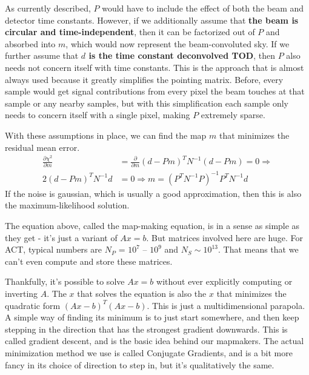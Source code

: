 \documentclass[a4paper, 11pt]{article}
\newcommand{\assume}[1]{{\bf#1}}
\begin{document}
As currently described, $P$ would have to include the effect of both the
beam and detector time constants. However, if we additionally assume that
\assume{the beam is circular and time-independent}, then it can be factorized out
of $P$ and absorbed into $m$, which would now represent the beam-convoluted sky.
If we further assume that \assume{$d$ is the time constant deconvolved TOD}, then $P$ also needs not
concern itself with time constants.
This is the approach that is almost always used because it greatly simplifies
the pointing matrix. Before, every sample would get signal contributions from
every pixel the beam touches at that sample or any nearby samples, but with this
simplification each sample only needs to concern itself with a single pixel,
making $P$ extremely sparse.

With these assumptions in place, we can find the map $m$ that minimizes the
residual mean error.
\begin{align}
	\frac{\partial\chi^2}{\partial m} &= \frac{\partial}{\partial m}(d-Pm)^T N^{-1}(d-Pm) = 0 \Rightarrow \\
	2(d-Pm)^T N^{-1}d &= 0 \Rightarrow
	m = (P^TN^{-1}P)^{-1} P^TN^{-1} d
\end{align}
If the noise is gaussian, which is usually a good approximation, then this is also
the maximum-likelihood solution.

The equation above, called the map-making equation, is in a sense as simple
as they get - it's just a variant of $Ax=b$. But matrices involved here are huge.
For ACT, typical numbers are $N_P$ = $10^7$ -- $10^9$ and $N_S \sim 10^{13}$.
That means that we can't even compute and store these matrices.

Thankfully, it's possible to solve $Ax=b$ without ever explicitly computing or
inverting $A$. The $x$ that solves the equation is also the $x$ that minimizes
the quadratic form $(Ax-b)^T(Ax-b)$. This is just a multidimensional parapola.
A simple way of finding its minimum is to just start somewhere, and then keep
stepping in the direction that has the strongest gradient downwards. This is
called gradient descent, and is the basic idea behind our mapmakers. The actual
minimization method we use is called Conjugate Gradients, and is a bit more
fancy in its choice of direction to step in, but it's qualitatively the same.
\end{document}
